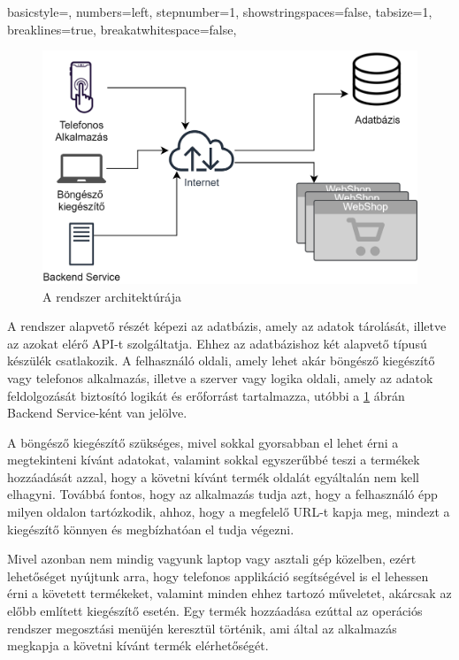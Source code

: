 \lstset
{
    basicstyle=\footnotesize,
    numbers=left,
    stepnumber=1,
    showstringspaces=false,
    tabsize=1,
    breaklines=true,
    breakatwhitespace=false,
}


\begin{figure}[H]
    \centering
    \includegraphics[scale=1.2]{figures/images/architecture_horizontal_HU.png}
    \caption{A rendszer architektúrája}
    \label{fig:architecture}
\end{figure}

A rendszer alapvető részét képezi az adatbázis, amely az adatok tárolását, illetve az azokat elérő API-t szolgáltatja. Ehhez az adatbázishoz két alapvető típusú készülék csatlakozik. A felhasználó oldali, amely lehet akár böngésző kiegészítő vagy telefonos alkalmazás, illetve a szerver vagy logika oldali, amely az adatok feldolgozását biztosító logikát és erőforrást tartalmazza, utóbbi a \ref{fig:architecture} ábrán Backend Service-ként van jelölve. 

A böngésző kiegészítő szükséges, mivel sokkal gyorsabban el lehet érni a megtekinteni kívánt adatokat, valamint sokkal egyszerűbbé teszi a termékek hozzáadását azzal, hogy a követni kívánt termék oldalát egyáltalán nem kell elhagyni. Továbbá fontos, hogy az alkalmazás tudja azt, hogy a felhasználó épp milyen oldalon tartózkodik, ahhoz, hogy a megfelelő URL-t kapja meg, mindezt a kiegészítő könnyen és megbízhatóan el tudja végezni.

Mivel azonban nem mindig vagyunk laptop vagy asztali gép közelben, ezért lehetőséget nyújtunk arra, hogy telefonos applikáció segítségével is el lehessen érni a követett termékeket, valamint minden ehhez tartozó műveletet, akárcsak az előbb említett kiegészítő esetén. Egy termék hozzáadása ezúttal az operációs rendszer megosztási menüjén keresztül történik, ami által az alkalmazás megkapja a követni kívánt termék elérhetőségét.

